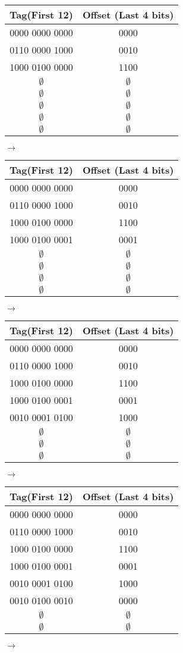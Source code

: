\documentclass{exam}
\begin{document}
\begin{questions}
\begin{tabular}{c c}
\textbf{Tag(First 12)}&\textbf{Offset (Last 4 bits)}\\ [0.5ex]
\hline \hline
0000 0000 0000 &0000\\
0110 0000 1000 & 0010\\
1000 0100 0000 & 1100\\
$\emptyset$ & $\emptyset$\\
$\emptyset$ & $\emptyset$\\
$\emptyset$ & $\emptyset$\\
$\emptyset$ & $\emptyset$\\
$\emptyset$ & $\emptyset$\\
\end{tabular} $\rightarrow$
\begin{tabular}{c c}
\textbf{Tag(First 12)}&\textbf{Offset (Last 4 bits)}\\ [0.5ex]
\hline \hline
0000 0000 0000 &0000\\
0110 0000 1000 & 0010\\
1000 0100 0000 & 1100\\
1000 0100 0001 & 0001\\
$\emptyset$ & $\emptyset$\\
$\emptyset$ & $\emptyset$\\
$\emptyset$ & $\emptyset$\\
$\emptyset$ & $\emptyset$\\
\end{tabular} $\rightarrow$

\begin{tabular}{c c}
\textbf{Tag(First 12)}&\textbf{Offset (Last 4 bits)}\\ [0.5ex]
\hline \hline
0000 0000 0000 &0000\\
0110 0000 1000 & 0010\\
1000 0100 0000 & 1100\\
1000 0100 0001 & 0001\\
0010 0001 0100 & 1000\\
$\emptyset$ & $\emptyset$\\
$\emptyset$ & $\emptyset$\\
$\emptyset$ & $\emptyset$\\
\end{tabular} $\rightarrow$
\begin{tabular}{c c}
\textbf{Tag(First 12)}&\textbf{Offset (Last 4 bits)}\\ [0.5ex]
\hline \hline
0000 0000 0000 &0000\\
0110 0000 1000 & 0010\\
1000 0100 0000 & 1100\\
1000 0100 0001 & 0001\\
0010 0001 0100 & 1000\\
0010 0100 0010 & 0000\\
$\emptyset$ & $\emptyset$\\
$\emptyset$ & $\emptyset$\\
\end{tabular} $\rightarrow$


\end{questions}
\end{document}
